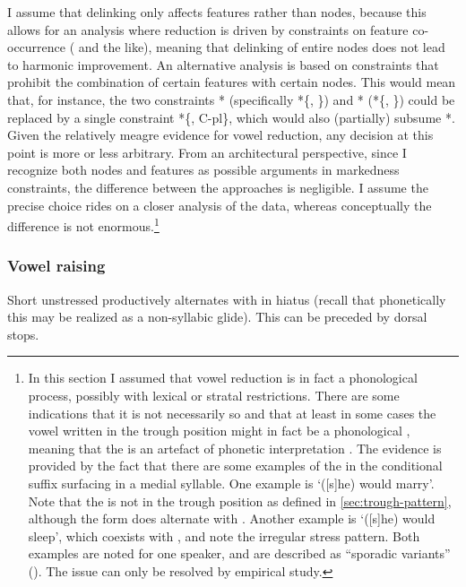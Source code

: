 I assume that delinking only affects features rather than nodes, because this allows for an analysis where reduction is driven by constraints on feature co\hyp occurrence (\ie *\ipa{[æ]} and the like), meaning that delinking of entire nodes does not lead to harmonic improvement. An alternative analysis is based on constraints that prohibit the combination of certain features with certain nodes. This would mean that, for instance, the two constraints *\ipa{[ɛ]} (specifically *\{, \}) and *\ipa{[ɔ]} (*\{, \}) could be replaced by a single constraint *\{, C-pl\}, which would also (partially) subsume *\ipa{[æ]}. Given the relatively meagre evidence for vowel reduction, any decision at this point is more or less arbitrary. From an architectural perspective, since I recognize both nodes and features as possible arguments in markedness constraints, the difference between the approaches is negligible. I assume the precise choice rides on a closer analysis of the data, whereas conceptually the difference is not enormous.\footnote{In this section I assumed that vowel reduction is in fact a phonological process, possibly with lexical or stratal restrictions. There are some indications that it is not necessarily so and that at least in some cases the vowel written \ipa{[ə]} in the trough position might in fact be a phonological \ipa{[æ]}, meaning that the  is an artefact of phonetic interpretation \citep[\cfm][]{barnes2007,iosad10:_motiv}. The evidence is provided by the fact that there are some examples of the \ipa{[æ]} in the conditional suffix  surfacing in a medial syllable. One example is \ipa{[ˈøːrəʒæfæ]} `([s]he) would marry'. Note that the \ipa{[æ]} is not in the trough position as defined in \cref{sec:trough-pattern}, although the form does alternate with \ipa{[ˈøːrəʒfæ]}. Another example is \ipa{[ˌkusˈkæfæ]} `([s]he) would sleep', which coexists with \ipa{[ˈkuskfæ]}, and note the irregular stress pattern. Both examples are noted for one speaker, and are described as \enquote{sporadic variants} (). The issue can only be resolved by empirical study.}

\subsubsection{Vowel raising}
\label{sec:vowel-raising}

Short unstressed \ipa{[e]} productively alternates with \ipa{[i]} in hiatus (recall that phonetically this \ipa{[i]} may be realized as a non-syllabic glide). This \ipa{[i]} can be preceded by dorsal stops.


